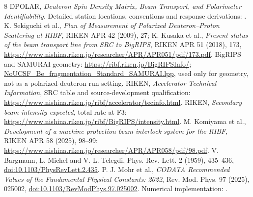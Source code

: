 \documentclass[11pt,a4paper]{article}
\begin{document}
\begingroup\footnotesize
\setlength{\parskip}{0pt}
\begin{thebibliography}{8}
\setlength{\itemsep}{3pt}
 DPOLAR, \emph{Deuteron Spin Density Matrix, Beam Transport, and Polarimeter Identifiability}. Detailed station locations, conventions and response derivations: .
 K. Sekiguchi et al., \emph{Plan of Measurement of Polarized Deuteron--Proton Scattering at RIBF}, RIKEN APR 42 (2009), 27; K. Kusaka et al., \emph{Present status of the beam transport line from SRC to BigRIPS}, RIKEN APR 51 (2018), 173, \url{https://www.nishina.riken.jp/researcher/APR/APR051/pdf/173.pdf}.
BigRIPS and SAMURAI geometry: \url{https://ribf.riken.jp/BigRIPSInfo/}; \href{https://ribf.riken.jp/BigRIPSInfo/lise/NoUCSF_Be_fragmentation_Standard_SAMURAI.lpp}{NoUCSF\_Be\_fragmentation\_Standard\_SAMURAI.lpp}, used only for geometry, not as a polarized-deuteron run setting.
 RIKEN, \emph{Accelerator Technical Information}, SRC table and source-development qualification: \url{https://www.nishina.riken.jp/ribf/accelerator/tecinfo.html}.
 RIKEN, \emph{Secondary beam intensity expected}, total rate at F3: \url{https://www.nishina.riken.jp/ribf/BigRIPS/intensity.html}.
 M. Komiyama et al., \emph{Development of a machine protection beam interlock system for the RIBF}, RIKEN APR 58 (2025), 98--99: \url{https://www.nishina.riken.jp/researcher/APR/APR058/pdf/98.pdf}.
 V. Bargmann, L. Michel and V. L. Telegdi, Phys. Rev. Lett. 2 (1959), 435--436, \href{https://doi.org/10.1103/PhysRevLett.2.435}{doi:10.1103/PhysRevLett.2.435}.
 P. J. Mohr et al., \emph{CODATA Recommended Values of the Fundamental Physical Constants: 2022}, Rev. Mod. Phys. 97 (2025), 025002, \href{https://doi.org/10.1103/RevModPhys.97.025002}{doi:10.1103/RevModPhys.97.025002}. Numerical implementation: .
\end{thebibliography}
\endgroup
\end{document}
